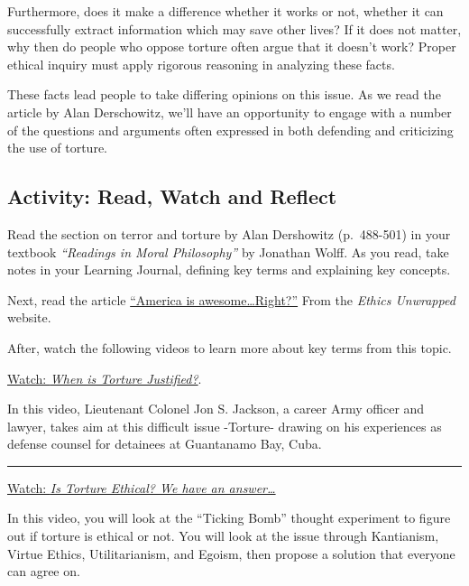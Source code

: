\documentclass[
]{book}
\begin{document}
Furthermore, does it make a difference whether it works or not, whether it can successfully extract information which may save other lives? If it does not matter, why then do people who oppose torture often argue that it doesn't work? Proper ethical inquiry must apply rigorous reasoning in analyzing these facts.

These facts lead people to take differing opinions on this issue. As we read the article by Alan Derschowitz, we'll have an opportunity to engage with a number of the questions and arguments often expressed in both defending and criticizing the use of torture.

\hypertarget{activity-read-watch-and-reflect-12}{%
\subsection*{Activity: Read, Watch and Reflect}\label{activity-read-watch-and-reflect-12}}

\begin{reflect}
Read the section on terror and torture by Alan Dershowitz (p.~488-501) in your textbook \emph{``Readings in Moral Philosophy''} by Jonathan Wolff. As you read, take notes in your Learning Journal, defining key terms and explaining key concepts.

Next, read the article \href{https://ethicsunwrapped.utexas.edu/america-awesome-right}{``America is awesome\ldots Right?''} From the \emph{Ethics Unwrapped} website.

After, watch the following videos to learn more about key terms from this topic.

\href{https://www.youtube.com/watch?v=3548Ac9wGN8}{Watch: \emph{When is Torture Justified?}}.

In this video, Lieutenant Colonel Jon S. Jackson, a career Army officer and lawyer, takes aim at this difficult issue -Torture- drawing on his experiences as defense counsel for detainees at Guantanamo Bay, Cuba.

\begin{center}\rule{0.5\linewidth}{0.5pt}\end{center}

\href{https://www.youtube.com/watch?v=MfApHodpExM}{Watch: \emph{Is Torture Ethical? We have an answer\ldots{}}}

In this video, you will look at the ``Ticking Bomb'' thought experiment to figure out if torture is ethical or not. You will look at the issue through Kantianism, Virtue Ethics, Utilitarianism, and Egoism, then propose a solution that everyone can agree on.
\end{reflect}
\end{document}
